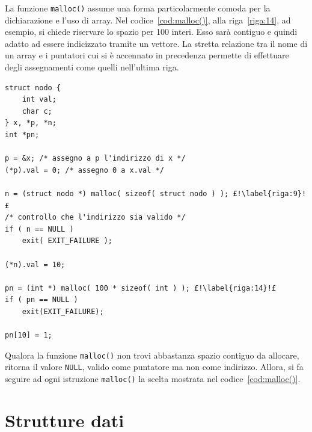 La funzione \lstinline!malloc()! assume una forma particolarmente comoda per la dichiarazione e l'uso di array.
Nel codice~\ref{cod:malloc()}, alla riga~\ref{riga:14}, ad esempio, si chiede riservare lo spazio per \num{100} interi.
Esso sarà contiguo e quindi adatto ad essere indicizzato tramite un vettore.
La stretta relazione tra il nome di un array e i puntatori cui si è accennato in precedenza permette di effettuare degli assegnamenti come quelli nell'ultima riga.
\begin{lstlisting}[caption={[\em Uso della funzione \lstinline!malloc()!.]{\em Uso della funzione \lstinline!malloc()!. Si  faccia particolare attenzione a non dimenticare d'inserire la scelta immediatamente dopo aver richiamato tale funzione.}}, label={cod:malloc()}]
struct nodo {
	int val;
	char c;
} x, *p, *n;
int *pn;

p = &x; /* assegno a p l'indirizzo di x */
(*p).val = 0; /* assegno 0 a x.val */

n = (struct nodo *) malloc( sizeof( struct nodo ) ); £!\label{riga:9}!£
/* controllo che l'indirizzo sia valido */
if ( n == NULL )
	exit( EXIT_FAILURE );

(*n).val = 10;

pn = (int *) malloc( 100 * sizeof( int ) ); £!\label{riga:14}!£
if ( pn == NULL )
	exit(EXIT_FAILURE);

pn[10] = 1;
\end{lstlisting}
Qualora la funzione \lstinline!malloc()! non trovi abbastanza spazio contiguo da allocare, ritorna il valore \lstinline!NULL!,  valido come puntatore ma non come indirizzo.
Allora, si fa seguire ad ogni istruzione \lstinline!malloc()! la scelta mostrata nel codice~\vref{cod:malloc()}.%

	\section{Strutture dati}
